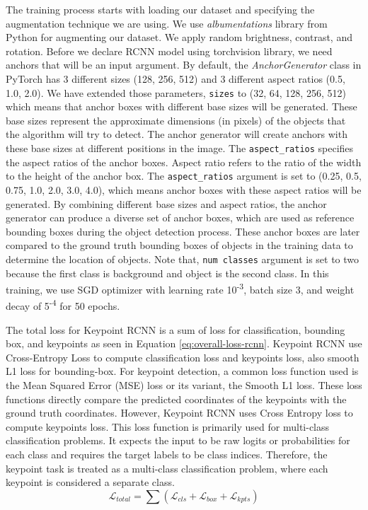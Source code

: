 The training process starts with loading our dataset and specifying the augmentation technique we are using. We use \emph{albumentations} library from Python for augmenting our dataset.
We apply random brightness, contrast, and rotation.
Before we declare RCNN model using torchvision library, we need anchors that will be an input argument. 
By default, the \emph{AnchorGenerator} class in PyTorch has 3 different sizes (128, 256, 512) and 3 different aspect ratios (0.5, 1.0, 2.0).
We have extended those parameters, \verb|sizes| to (32, 64, 128, 256, 512) which means that anchor boxes with different base sizes will be generated. These base sizes represent the approximate dimensions (in pixels) of the objects that the algorithm will try to detect.
The anchor generator will create anchors with these base sizes at different positions in the image.
The \verb|aspect_ratios| specifies the aspect ratios of the anchor boxes. Aspect ratio refers to the ratio of the width to the height of the anchor box.
The \verb|aspect_ratios| argument is set to (0.25, 0.5, 0.75, 1.0, 2.0, 3.0, 4.0), which means anchor boxes with these aspect ratios will be generated. By combining different base sizes and aspect ratios, the anchor generator can produce a diverse set of anchor boxes,
which are used as reference bounding boxes during the object detection process. These anchor boxes are later compared to the ground truth bounding boxes of objects in the training data to determine the location of objects.
Note that, \verb|num classes| argument is set to two because the first class is background and object is the second class.
In this training, we use SGD optimizer with learning rate 10\textsuperscript{-3}, batch size 3, and weight decay of 5\textsuperscript{-4} for 50 epochs.

The total loss for Keypoint RCNN is a sum of loss for classification, bounding box, and keypoints as seen in Equation \ref{eq:overall-loss-rcnn}.
Keypoint RCNN use Cross-Entropy Loss to compute classification loss and keypoints loss, also smooth L1 loss for bounding-box. 
For keypoint detection, a common loss function used is the Mean Squared Error (MSE) loss or its variant, the Smooth L1 loss. These loss functions directly compare the predicted coordinates of the keypoints with the ground truth coordinates.
However, Keypoint RCNN uses Cross Entropy loss to compute keypoints loss. This loss function is primarily used for multi-class classification problems. It expects the input to be raw logits or probabilities for each class and requires the target labels to be class indices. Therefore, the keypoint task is treated as a multi-class classification problem, where each keypoint is considered a separate class.
\begin{equation}
  \label{eq:overall-loss-rcnn}
  \mathcal{L}_{total} = \sum (\mathcal{L}_{cls} + \mathcal{L}_{box} + \mathcal{L}_{kpts})
\end{equation}

